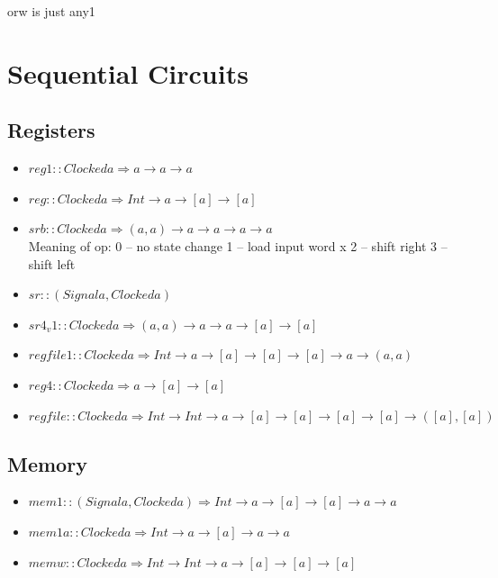 \documentclass[a4paper,openany,fleqn]{book}
\begin{document}
orw is just any1

\chapter{Sequential Circuits}
\label{sec:app-sequ-circ}

\section{Registers}
\label{sec:registers}

\begin{itemize}
\item $reg1 :: Clocked a \Rightarrow a \rightarrow a \rightarrow a $
\item $reg :: Clocked a \Rightarrow Int \rightarrow a \rightarrow [a] \rightarrow [a]$
\item $srb :: Clocked a \Rightarrow (a,a) \rightarrow a \rightarrow a \rightarrow a \rightarrow a$ \\
  Meaning of op: 0 -- no state change 1 -- load input word x 2 --
  shift right 3 -- shift left
\item $sr :: (Signal a, Clocked a)$
\item $ sr4_v1 :: Clocked a \Rightarrow (a,a) \rightarrow a \rightarrow a \rightarrow [a] \rightarrow [a]$
\item $regfile1 :: Clocked a \Rightarrow Int \rightarrow a \rightarrow
  [a] \rightarrow [a] \rightarrow [a] \rightarrow a \rightarrow (a,a)$
\item $reg4 :: Clocked a \Rightarrow a \rightarrow [a] \rightarrow [a]$
\item $regfile :: Clocked a \Rightarrow Int \rightarrow Int
  \rightarrow a \rightarrow [a] \rightarrow [a] \rightarrow [a]
  \rightarrow [a] \rightarrow ([a],[a])$
\end{itemize}

\section{Memory}
\label{sec:memory-1}

\begin{itemize}
\item $mem1 :: (Signal a, Clocked a) \Rightarrow Int \rightarrow a
  \rightarrow [a] \rightarrow [a] \rightarrow a \rightarrow a$
\item $mem1a :: Clocked a \Rightarrow Int \rightarrow a \rightarrow [a] \rightarrow a \rightarrow a$
\item $memw :: Clocked a \Rightarrow Int \rightarrow Int \rightarrow a
  \rightarrow [a] \rightarrow [a] \rightarrow [a]$
\end{itemize}
\end{document}
